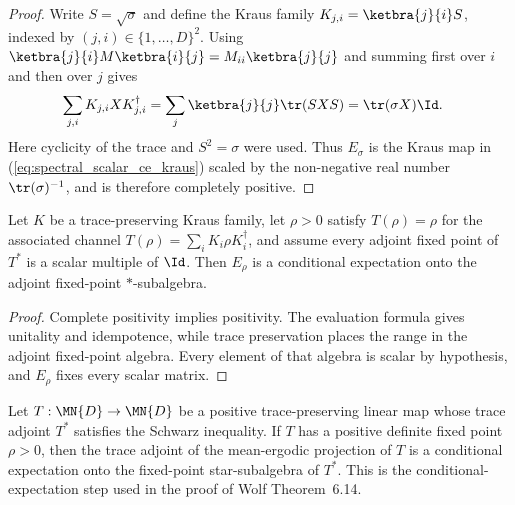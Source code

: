 \begin{proof}\leanok
    Write $S=\sqrt{\sigma}$ and define the Kraus family
    $K_{j,i}=\ketbra{j}{i}S$, indexed by
    $(j,i)\in\{1,\ldots,D\}^2$. Using
    $\ketbra{j}{i}M\ketbra{i}{j}=M_{ii}\ketbra{j}{j}$ and summing first over
    $i$ and then over $j$ gives
    \begin{align}
        \sum_{j,i}K_{j,i}XK_{j,i}^\dagger
        &=\sum_j\ketbra{j}{j}\tr(SXS)
          =\tr(\sigma X)\Id.
        \label{eq:spectral_scalar_ce_kraus}
    \end{align}
    Here cyclicity of the trace and $S^2=\sigma$ were used. Thus
    $E_\sigma$ is the Kraus map in
    (\ref{eq:spectral_scalar_ce_kraus}) scaled by the non-negative real
    number $\tr(\sigma)^{-1}$, and is therefore completely positive.
\end{proof}

\begin{theorem}
    \label{thm:scalar_conditional_expectation_isConditionalExpectation}
    \leanok
    Let $K$ be a trace-preserving Kraus family, let $\rho>0$ satisfy
    $T(\rho)=\rho$ for the associated channel
    $T(\rho)=\sum_iK_i\rho K_i^\dagger$, and assume every adjoint fixed point
    of $T^*$ is a scalar multiple of $\Id$. Then $E_\rho$ is a conditional
    expectation onto the adjoint fixed-point $*$-subalgebra.
\end{theorem}

\begin{proof}\leanok
    Complete positivity implies positivity. The evaluation formula gives
    unitality and idempotence, while trace preservation places the range in
    the adjoint fixed-point algebra. Every element of that algebra is scalar
    by hypothesis, and $E_\rho$ fixes every scalar matrix.
\end{proof}

\begin{theorem}
    \label{thm:meanErgodicAdjoint_isConditionalExpectation}
    \leanok
    Let $T:\MN{D}\to\MN{D}$ be a positive trace-preserving linear map
    whose trace adjoint $T^*$ satisfies the Schwarz inequality.  If $T$ has a
    positive definite fixed point $\rho>0$, then the trace adjoint of the
    mean-ergodic projection of $T$ is a conditional expectation onto the
    fixed-point star-subalgebra of $T^*$.
    This is the conditional-expectation step used in the proof of
    Wolf Theorem~6.14.
\end{theorem}

